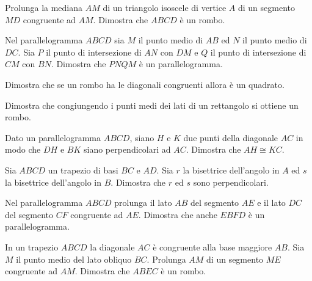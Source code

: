 \begin{multicols}{2}
\begin{esercizio}
\label{ese:4.20}
Prolunga la mediana $AM$ di un triangolo isoscele di vertice $A$ di un segmento $MD$ congruente ad $AM$. Dimostra che $ABCD$ è un rombo.
\end{esercizio}

\begin{esercizio}
\label{ese:4.21}
Nel parallelogramma $ABCD$ sia $M$ il punto medio di $AB$ ed $N$ il punto medio di $DC$. Sia $P$ il punto di intersezione di $AN$ con $DM$ e $Q$ il punto di intersezione di $CM$ con $BN$. Dimostra che $PNQM$ è un parallelogramma.
\end{esercizio}

\begin{esercizio}
\label{ese:4.22}
Dimostra che se un rombo ha le diagonali congruenti allora è un quadrato.
\end{esercizio}

\begin{esercizio}
\label{ese:4.23}
Dimostra che congiungendo i punti medi dei lati di un rettangolo si ottiene un rombo.
\end{esercizio}

\begin{esercizio}
\label{ese:4.24}
Dato un parallelogramma $ABCD$, siano $H$ e $K$ due punti della diagonale $AC$ in modo che $DH$ e $BK$ siano perpendicolari ad $AC$. Dimostra che $AH\cong KC$.
\end{esercizio}

\begin{esercizio}
\label{ese:4.25}
Sia $ABCD$ un trapezio di basi $BC$ e $AD$. Sia $r$ la bisettrice dell'angolo in $A$ ed $s$ la bisettrice dell'angolo in $B$. Dimostra che $r$ ed $s$ sono perpendicolari.
\end{esercizio}

\begin{esercizio}
\label{ese:4.26}
Nel parallelogramma $ABCD$ prolunga il lato $AB$ del segmento $AE$ e il lato $DC$ del segmento $CF$ congruente ad $AE$. Dimostra che anche $EBFD$ è un parallelogramma.
\end{esercizio}

\begin{esercizio}
\label{ese:4.27}
In un trapezio $ABCD$ la diagonale $AC$ è congruente alla base maggiore $AB$. Sia $M$ il punto medio del lato obliquo $BC$. Prolunga $AM$ di un segmento $ME$ congruente ad $AM$. Dimostra che $ABEC$ è un rombo.
\end{esercizio}


\end{multicols}
